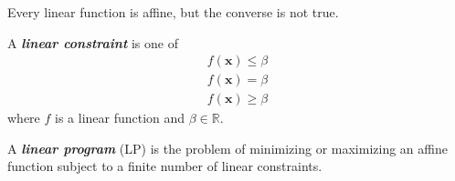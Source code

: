 \begin{remark}
    Every linear function is affine, but the converse is not true.
\end{remark}

\begin{defbox}
    \begin{definition}
        A \textbf{\emph{linear constraint}} is one of
        \begin{align*}
            f(\bm{x})\leqslant \beta \\
            f(\bm{x})=\beta          \\
            f(\bm{x})\geqslant  \beta
        \end{align*}
        where $f$ is a linear function and $ \beta\in\mathbb{R} $.
    \end{definition}
\end{defbox}

\begin{defbox}
    \begin{definition}
        A \textbf{\emph{linear program}} (LP) is the problem of minimizing or
        maximizing an affine function subject to a finite number
        of linear constraints.
    \end{definition}
\end{defbox}
